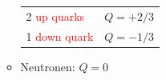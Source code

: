 \documentclass{beamer}
\begin{document}
\begin{frame}[t]
\begin{columns}
\begin{column}{0.55\textwidth}
\begin{itemize}
\begin{itemize}
{            \begin{center}
              \begin{tabular}{ll}
                2 \textcolor{red}{up quarks} & $Q=+2/3$  \\
                1 \textcolor{red}{down quark}& $Q=-1/3$ \\
              \end{tabular}
            \end{center}
          }
        \item<4-> Neutronen: $Q=0$
        \end{itemize}
      \end{itemize}
    \end{column}
    \begin{column}{0.2\textwidth}
      \centering
      \vskip-3cm
      \hskip-2cm
    \end{column}
  \end{columns}
\end{frame}
\end{document}
